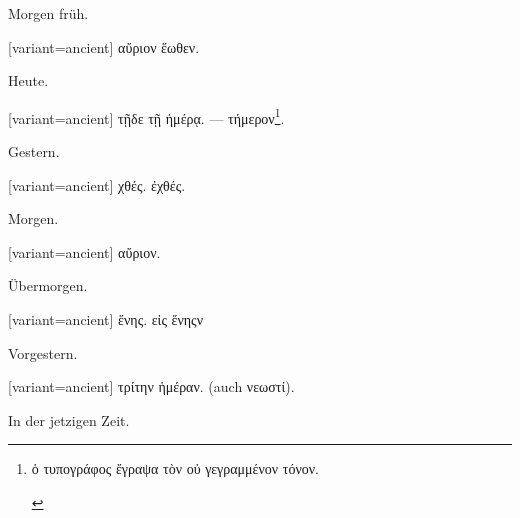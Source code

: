 Morgen früh.

\switchcolumn

\begin{greek}[variant=ancient]%
αὔριον ἕωθεν.

\end{greek}%
\switchcolumn*

Heute.

\switchcolumn

\begin{greek}[variant=ancient]%
τῇδε τῇ ἡμέρᾳ. --- τήμερον\footnote{\begin{latin}%
\textgreek[variant=ancient]{ὁ τυπογράφος ἔγραψα τὸν οὐ γεγραμμένον
τόνον.}\end{latin}%
}.

\end{greek}%
\switchcolumn*

Gestern.

\switchcolumn

\begin{greek}[variant=ancient]%
χθές. ἐχθές.

\end{greek}%
\switchcolumn*

Morgen.

\switchcolumn

\begin{greek}[variant=ancient]%
αὔριον.

\end{greek}%
\switchcolumn*

Übermorgen.

\switchcolumn

\begin{greek}[variant=ancient]%
ἕνης. εἰς ἕνηςν

\end{greek}%
\switchcolumn*

Vorgestern.

\switchcolumn

\begin{greek}[variant=ancient]%
τρίτην ἡμέραν. (\textgerman[spelling=old,babelshorthands=true]{auch}
νεωστί).

\end{greek}%
\indent In der jetzigen Zeit.

